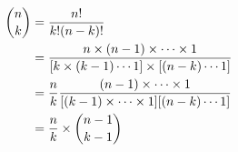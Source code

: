 \documentclass[preview]{standalone}
\begin{document}
\begin{align*}
{n \choose k} &= { {n!} \over {k! (n-k)!} } \\ &= { n \times (n-1) \times \cdots \times 1 \over { [ k \times (k-1) \cdots 1] \times  [(n-k) \cdots 1] } } \\ &= { n \over k } { (n-1) \times \cdots \times 1 \over [ (k-1) \times \cdots \times 1 ] [ (n-k) \cdots 1 ] }\\ & = { n \over k } \times { {n-1} \choose {k-1} }
\end{align*}
\end{document}
